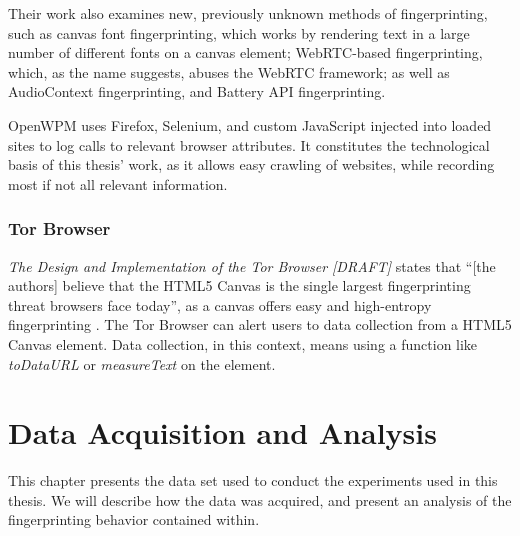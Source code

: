 \documentclass[
    fontsize=12pt,
    headings=small,
    parskip=half,
    bibliography=totoc,
    numbers=noenddot,
    open=any
    ]{scrreprt}
\begin{document}
Their work also examines new, previously unknown methods of fingerprinting, such as canvas font fingerprinting, which
works by rendering text in a large number of different fonts on a canvas element; WebRTC-based fingerprinting, which,
as the name suggests, abuses the WebRTC framework; as well as AudioContext fingerprinting, and Battery API fingerprinting.

OpenWPM uses Firefox, Selenium, and custom JavaScript injected into loaded sites to log calls to relevant browser attributes.
It constitutes the technological basis of this thesis' work, as it allows easy crawling of websites, while recording
most if not all relevant information.


\subsection{Tor Browser}
\label{related_work:tor_browser}
\textit{The Design and Implementation of the Tor Browser [DRAFT]}
states that ``[the authors] believe that the HTML5 Canvas is the single largest fingerprinting threat browsers face today'',
as a canvas offers easy and high-entropy fingerprinting
\cite{acar2014web,mowery2012pixel,torbrowser2018design}.
The Tor Browser can alert users to data collection from a HTML5 Canvas element.
Data collection, in this context, means using a function like \textit{toDataURL} or \textit{measureText} on the element.



\chapter{Data Acquisition and Analysis}
\label{chap:data_acquisition}
This chapter presents the data set used to conduct the experiments used in this thesis.
We will describe how the data was acquired, and present an analysis of the fingerprinting
behavior contained within.
\end{document}
